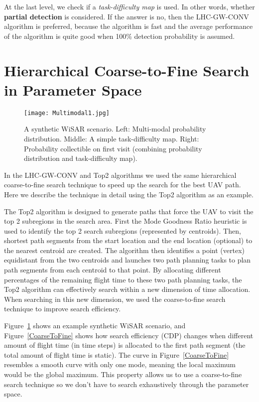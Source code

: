 At the last level, we check if a \textit{task-difficulty map} is used. In other words, whether \textbf{partial detection} is considered. If the answer is no, then the LHC-GW-CONV algorithm is preferred, because the algorithm is fast and the average performance of the algorithm is quite good when 100\% detection probability is assumed.


\section{Hierarchical Coarse-to-Fine Search in Parameter Space}
\label{CTF}

\begin{figure}
\centering
\texttt{[image: Multimodal1.jpg]}
\caption{A synthetic WiSAR scenario. Left: Multi-modal probability distribution. Middle: A simple task-difficulty map. Right: Probability collectible on first visit (combining probability distribution and task-difficulty map).}
\label{SyntheticCase2}
\end{figure}

In the LHC-GW-CONV and Top2 algorithms we used the same hierarchical coarse-to-fine search technique to speed up the search for the best UAV path. Here we describe the technique in detail using the Top2 algorithm as an example.

The Top2 algorithm is designed to generate paths that force the UAV to visit the top 2 subregions in the search area. First the Mode Goodness Ratio heuristic is used to identify the top 2 search subregions (represented by centroids). Then, shortest path segments from the start location and the end location (optional) to the nearest centroid are created. The algorithm then identifies a point (vertex) equidistant from the two centroids and launches two path planning tasks to plan path segments from each centroid to that point. By allocating different percentages of the remaining flight time to these two path planning tasks, the Top2 algorithm can effectively search within a new dimension of time allocation. When searching in this new dimension, we used the coarse-to-fine search technique to improve search efficiency.

Figure~\ref{SyntheticCase2} shows an example synthetic WiSAR scenario, and Figure~\ref{CoarseToFine} shows how search efficiency (CDP) changes when different amount of flight time (in time steps) is allocated to the first path segment (the total amount of flight time is static). The curve in Figure~\ref{CoarseToFine} resembles a smooth curve with only one mode, meaning the local maximum would be the global maximum. This property allows us to use a coarse-to-fine search technique so we don't have to search exhaustively through the parameter space.

